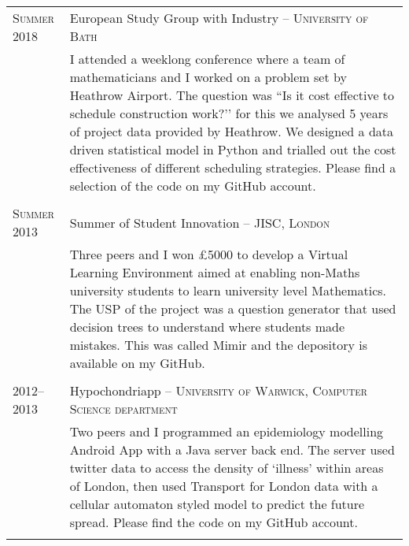 \documentclass[a4paper,10pt]{article}
\begin{document}
\begin{tabular}{p{2.25cm}|p{15cm}}
	\textsc{Summer 2018} & European Study Group with Industry -- \textsc{University of Bath} \\&\footnotesize{I attended a weeklong conference where a team of mathematicians and I worked on a problem set by Heathrow Airport. The question was ``Is it cost effective to schedule construction work?’’ for this we analysed 5 years of project data provided by Heathrow. We designed a data driven statistical model in Python and trialled out the cost effectiveness of different scheduling strategies. Please find a selection of the code on my GitHub account.}\\\multicolumn{2}{c}{} \\
	\textsc{Summer 2013} & Summer of Student Innovation -- \textsc{JISC, London} \\&\footnotesize{Three peers and I won £5000 to develop a Virtual Learning Environment aimed at enabling non-Maths university students to learn university level Mathematics. The USP of the project was a question generator that used decision trees to understand where students made mistakes. This was called Mimir and the depository is available on my GitHub.}\\\multicolumn{2}{c}{} \\
	\textsc{2012--2013} & Hypochondriapp -- \textsc{University of Warwick, Computer Science department} \\&\footnotesize{Two peers and I programmed an epidemiology modelling Android App with a Java server back end. The server used twitter data to access the density of `illness' within areas of London, then used Transport for London data with a cellular automaton styled model to predict the future spread. Please find the code on my GitHub account.}\\\multicolumn{2}{c}{}
\end{tabular}
\end{document}
